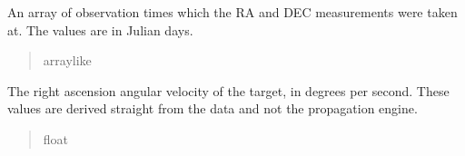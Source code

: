 \documentclass[letterpaper,11pt,english]{sphinxmanual}
\begin{document}
\begin{savenotes}
\begin{fulllineitems}

\begin{savenotes}\begin{fulllineitems}
\label{\detokenize{code/opihiexarata.propagate.solution:opihiexarata.propagate.solution.PropagativeSolution.obs_time_array}}
\pysigstartsignatures
{}
\pysigstopsignatures
\sphinxAtStartPar
An array of observation times which the RA and DEC measurements
were taken at. The values are in Julian days.
\begin{quote}\begin{description}
\sphinxAtStartPar
array\sphinxhyphen{}like

\end{description}\end{quote}

\end{fulllineitems}\end{savenotes}


\begin{savenotes}\begin{fulllineitems}
\label{\detokenize{code/opihiexarata.propagate.solution:opihiexarata.propagate.solution.PropagativeSolution.raw_ra_velocity}}
\pysigstartsignatures
{}
\pysigstopsignatures
\sphinxAtStartPar
The right ascension angular velocity of the target, in degrees per
second. These values are derived straight from the data and not the
propagation engine.
\begin{quote}\begin{description}
\sphinxAtStartPar
float

\end{description}\end{quote}

\end{fulllineitems}\end{savenotes}



\end{fulllineitems}
\end{savenotes}
\end{document}
